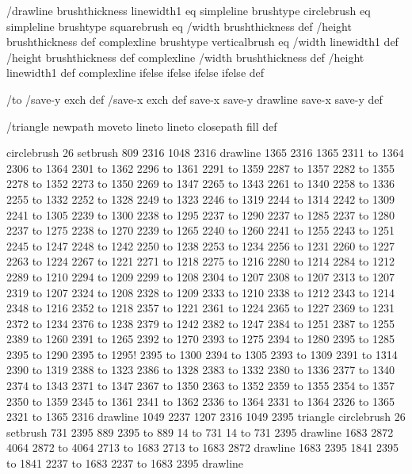 /drawline
  { brushthickness linewidth1 eq
    { simpleline }
    { brushtype circlebrush eq
       { %
         simpleline }
       { brushtype squarebrush eq
          { %
            /width brushthickness def
	    /height brushthickness def
	    complexline }
          { brushtype verticalbrush eq
             { %
	       /width linewidth1 def
	       /height brushthickness def
	       complexline }
             { %
	       /width brushthickness def
	       /height linewidth1 def
	       complexline }
             ifelse }
          ifelse }
       ifelse }
    ifelse } def

/to
 { /save-y exch def
   /save-x exch def
   save-x save-y drawline
   save-x save-y } def

/triangle
 { newpath moveto lineto lineto closepath fill } def

circlebrush 26 setbrush
809 2316 1048 2316 drawline
1365 2316 1365 2311 to 1364 2306 to 1364 2301 to 1362 2296 to 1361 2291 to 1359 2287 to 1357 2282 to 1355 2278 to 1352 2273 to 1350 2269 to 1347 2265 to 1343 2261 to 1340 2258 to 1336 2255 to 1332 2252 to 1328 2249 to 1323 2246 to 1319 2244 to 1314 2242 to 1309 2241 to 1305 2239 to 1300 2238 to 1295 2237 to 1290 2237 to 1285 2237 to 1280 2237 to 1275 2238 to 1270 2239 to 1265 2240 to 1260 2241 to 1255 2243 to 1251 2245 to 1247 2248 to 1242 2250 to 1238 2253 to 1234 2256 to 1231 2260 to 1227 2263 to 1224 2267 to 1221 2271 to 1218 2275 to 1216 2280 to 1214 2284 to 1212 2289 to 1210 2294 to 1209 2299 to 1208 2304 to 1207 2308 to 1207 2313 to 1207 2319 to 1207 2324 to 1208 2328 to 1209 2333 to 1210 2338 to 1212 2343 to 1214 2348 to 1216 2352 to 1218 2357 to 1221 2361 to 1224 2365 to 1227 2369 to 1231 2372 to 1234 2376 to 1238 2379 to 1242 2382 to 1247 2384 to 1251 2387 to 1255 2389 to 1260 2391 to 1265 2392 to 1270 2393 to 1275 2394 to 1280 2395 to 1285 2395 to 1290 2395 to 1295!
 2395 to 1300 2394 to 1305 2393 to
 1309 2391 to 1314 2390 to 1319 2388 to 1323 2386 to 1328 2383 to 1332 2380 to 1336 2377 to 1340 2374 to 1343 2371 to 1347 2367 to 1350 2363 to 1352 2359 to 1355 2354 to 1357 2350 to 1359 2345 to 1361 2341 to 1362 2336 to 1364 2331 to 1364 2326 to 1365 2321 to 1365 2316 drawline
1049 2237 1207 2316 1049 2395 triangle
circlebrush 26 setbrush
731 2395 889 2395 to 889 14 to 731 14 to 731 2395 drawline
1683 2872 4064 2872 to 4064 2713 to 1683 2713 to 1683 2872 drawline
1683 2395 1841 2395 to 1841 2237 to 1683 2237 to 1683 2395 drawline


